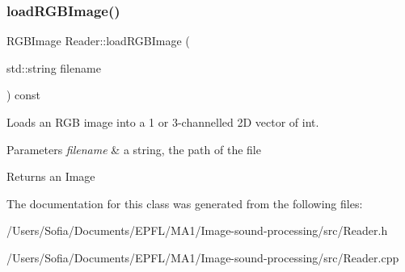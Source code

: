 \subsubsection{\texorpdfstring{load\+R\+G\+B\+Image()}{loadRGBImage()}}
{\footnotesize\ttfamily R\+G\+B\+Image Reader\+::load\+R\+G\+B\+Image (\begin{DoxyParamCaption}\item[{std\+::string}]{filename }\end{DoxyParamCaption}) const}



Loads an R\+GB image into a 1 or 3-\/channelled 2D vector of int. 


\begin{DoxyParams}{Parameters}
{\em filename} & a string, the path of the file \\
\hline
\end{DoxyParams}
\begin{DoxyReturn}{Returns}
an Image 
\end{DoxyReturn}


The documentation for this class was generated from the following files\+:\begin{DoxyCompactItemize}
\item 
/\+Users/\+Sofia/\+Documents/\+E\+P\+F\+L/\+M\+A1/\+Image-\/sound-\/processing/src/Reader.\+h\item 
/\+Users/\+Sofia/\+Documents/\+E\+P\+F\+L/\+M\+A1/\+Image-\/sound-\/processing/src/Reader.\+cpp\end{DoxyCompactItemize}
